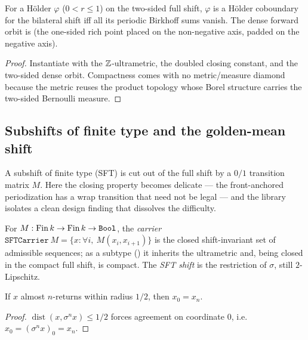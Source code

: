 \begin{theorem}\label{thm:livsic-bishift}
  \leanok
  For a Hölder \(\varphi\) (\(0 < r\le 1\)) on the two-sided full shift, \(\varphi\) is a Hölder
  coboundary for the bilateral shift iff all its periodic Birkhoff sums vanish. The dense forward
  orbit is  (the one-sided rich point placed
  on the non-negative axis, padded on the negative axis).
\end{theorem}
\begin{proof}\leanok
  Instantiate  with the \(\mathbb{Z}\)-ultrametric, the doubled closing constant, and
  the two-sided dense orbit. Compactness comes with no metric/measure diamond because the metric
  reuses the product topology whose Borel structure carries the two-sided Bernoulli measure.
\end{proof}

\subsection{Subshifts of finite type and the golden-mean shift}

A subshift of finite type (SFT) is cut out of the full shift by a \(0/1\) transition matrix
\(M\). Here the closing property becomes delicate --- the front-anchored periodization has a wrap
transition that need not be legal --- and the library isolates a clean design finding that dissolves
the difficulty.

\begin{definition}\label{def:livsic-sft}
  \leanok
  For \(M:\operatorname{Fin} k\to\operatorname{Fin} k\to\texttt{Bool}\), the \emph{carrier}
  \(\texttt{SFTCarrier}\ M = \{x : \forall i,\ M(x_i, x_{i+1})\}\) is the closed shift-invariant set
  of admissible sequences; as a subtype () it inherits the ultrametric and,
  being closed in the compact full shift, is compact. The \emph{SFT shift}
   is the restriction of \(\sigma\), still \(2\)-Lipschitz.
\end{definition}

\begin{lemma}[The \(\delta = 1/2\) crux]\label{lem:livsic-sft-half}
  \leanok
  If \(x\) almost \(n\)-returns within radius \(1/2\), then \(x_0 = x_n\).
\end{lemma}
\begin{proof}\leanok
  \(\operatorname{dist}(x,\sigma^n x)\le 1/2\) forces agreement on coordinate \(0\), i.e.\ \(x_0 = (\sigma^n x)_0 =
  x_n\).
\end{proof}

